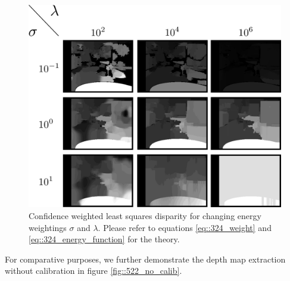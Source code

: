 \begin{figure}[h]
	\centering
	\includegraphics[scale=.25]{chapters/05_experiments/02_autonomous_walking/02_depth_map_parameter_tuning/sigma_lambda.png}
	\caption{Confidence weighted least squares disparity for changing energy weightings $\sigma$ and $\lambda$. Please refer to equations \ref{eq::324_weight} and \ref{eq::324_energy_function} for the theory.}
	\label{fig::522_sigma_lambda}
\end{figure}
For comparative purposes, we further demonstrate the depth map extraction without calibration in figure \ref{fig::522_no_calib}. 
